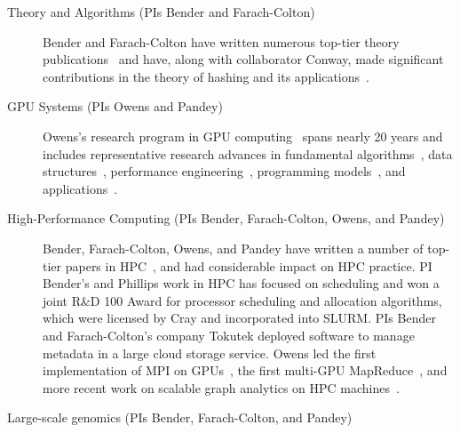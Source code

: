 \begin{description}
  \item[Theory and Algorithms (PIs Bender and Farach-Colton)]
    Bender and Farach-Colton have written numerous
    top-tier theory
    publications~\cite{DBLP:conf/stoc/BenderFK19,DBLP:conf/focs/BenderFGJM018,DBLP:conf/soda/BenderCCFJT19,DBLP:conf/soda/AfshaniBFFGT17,DBLP:conf/pods/BenderFJMMPX17,DBLP:conf/stoc/BenderKPY16,DBLP:conf/soda/BenderFGKM17,DBLP:conf/pods/BenderBJKMPSSZ16}
    and have, along with collaborator Conway, made significant contributions in
    the theory of hashing and its
    applications~\cite{BenderFaGo18,BenderFaJo12,BenderFaJo11,PandeyBeJo17,PandeyAlBe18,PandeyBeJo18,PandeyBeJo17c,DBLP:conf/icalp/ConwayFS18}.


    \item[GPU Systems (PIs Owens and Pandey)] Owens's research program in GPU computing~\cite{Owens:2007:ASO,Owens:2008:GC} spans nearly 20 years and includes representative research advances in fundamental algorithms~\cite{Sengupta:2007:SPF}, data structures~\cite{Lefohn:2006:GGE,Alcantara:2009:RPH}, performance engineering~\cite{Zhang:2011:AQP}, programming models~\cite{Gupta:2012:ASO, Tzeng:2010:TMF}, and applications~\cite{Wang:2017:GGG}.

    \item[High-Performance Computing (PIs Bender, Farach-Colton, Owens, and
        Pandey)] Bender, Farach-Colton, Owens, and Pandey have
      written a number of top-tier papers in HPC~\cite{pandey2020timely,bender2017two,eckstein2015pebbl,agrawal1989four,bender2008communication,greenberg1999enabling},
      and had considerable impact on HPC practice.  PI Bender's and Phillips
      work in HPC has focused on scheduling and  won a joint R\&D 100 Award for
      processor scheduling and allocation algorithms, which were licensed by
      Cray and incorporated into SLURM.  PIs Bender and Farach-Colton's company
      Tokutek deployed software to manage metadata in a large cloud storage
      service. Owens led the first implementation of MPI on GPUs~\cite{Stuart:2009:MPO:withouturl,Stuart:2011:EMT}, the first multi-GPU MapReduce~\cite{Stuart:2011:MMO}, and more recent work on scalable graph analytics on HPC machines~\cite{Pan:2018:SBS,Pan:2017:MGA,Chen:2022:SIP}.

    \item[Large-scale genomics (PIs Bender, Farach-Colton, and Pandey)]

\end{description}


